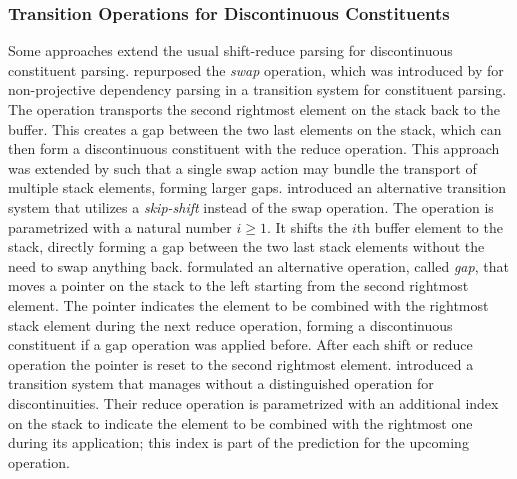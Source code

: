 \documentclass[../document.tex]{subfiles}
\begin{document}
    \subsubsection*{Transition Operations for Discontinuous Constituents}
    Some approaches extend the usual shift-reduce parsing for discontinuous constituent parsing.
     repurposed the \emph{swap} operation, which was introduced by \citet{Nivre09} for non-projective dependency parsing in a transition system for constituent parsing.
    The operation transports the second rightmost element on the stack back to the buffer.
    This creates a gap between the two last elements on the stack, which can then form a discontinuous constituent with the reduce operation.
    This approach was extended by \citet{Maier15} such that a single swap action may bundle the transport of multiple stack elements, forming larger gaps.
     introduced an alternative transition system that utilizes a \emph{skip-shift} instead of the swap operation.
    The operation is parametrized with a natural number \(i \ge 1\). It shifts the \(i\)th buffer element to the stack, directly forming a gap between the two last stack elements without the need to swap anything back.
     formulated an alternative operation, called \emph{gap}, that moves a pointer on the stack to the left starting from the second rightmost element.
    The pointer indicates the element to be combined with the rightmost stack element during the next reduce operation, forming a discontinuous constituent if a gap operation was applied before.
    After each shift or reduce operation the pointer is reset to the second rightmost element.
     introduced a transition system that manages without a distinguished operation for discontinuities.
    Their reduce operation is parametrized with an additional index on the stack to indicate the element to be combined with the rightmost one during its application; this index is part of the prediction for the upcoming operation.
\end{document}
